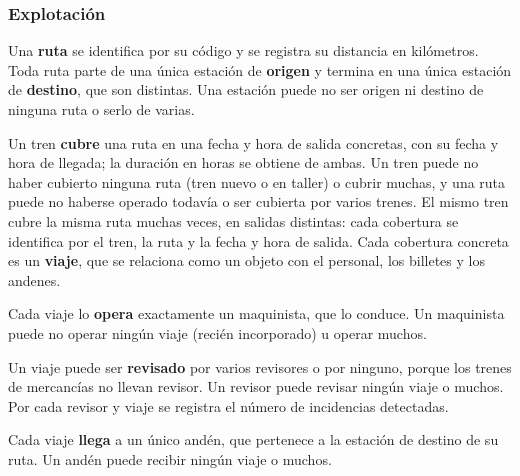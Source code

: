 \documentclass[11pt,a4paper]{article}
\DeclareRobustCommand{\_}{\textunderscore\allowbreak}
\newcommand{\RN}[1]{\textbf{RN-#1}}
\begin{document}
\subsubsection*{Explotación}
\begin{description}[leftmargin=1.4cm,style=nextline]
\item[\RN{14}] Una \textbf{ruta} se identifica por su código y se registra su distancia en kilómetros. Toda ruta parte de una única estación de \textbf{origen} y termina en una única estación de \textbf{destino}, que son distintas. Una estación puede no ser origen ni destino de ninguna ruta o serlo de varias.
\item[\RN{15}] Un tren \textbf{cubre} una ruta en una fecha y hora de salida concretas, con su fecha y hora de llegada; la duración en horas se obtiene de ambas. Un tren puede no haber cubierto ninguna ruta (tren nuevo o en taller) o cubrir muchas, y una ruta puede no haberse operado todavía o ser cubierta por varios trenes. El mismo tren cubre la misma ruta muchas veces, en salidas distintas: cada cobertura se identifica por el tren, la ruta y la fecha y hora de salida. Cada cobertura concreta es un \textbf{viaje}, que se relaciona como un objeto con el personal, los billetes y los andenes.
\item[\RN{16}] Cada viaje lo \textbf{opera} exactamente un maquinista, que lo conduce. Un maquinista puede no operar ningún viaje (recién incorporado) u operar muchos.
\item[\RN{17}] Un viaje puede ser \textbf{revisado} por varios revisores o por ninguno, porque los trenes de mercancías no llevan revisor. Un revisor puede revisar ningún viaje o muchos. Por cada revisor y viaje se registra el número de incidencias detectadas.
\item[\RN{18}] Cada viaje \textbf{llega} a un único andén, que pertenece a la estación de destino de su ruta. Un andén puede recibir ningún viaje o muchos.
\end{description}
\end{document}
